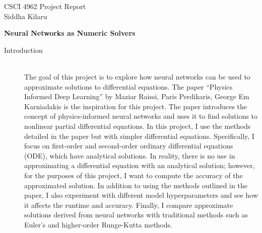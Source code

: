 \documentclass[12pt]{article}
\newcommand{\bgc}{\begin{center}}
\newcommand{\enc}{\end{center}}
\begin{document}
\noindent CSCI 4962 \hfill Project Report \\
Siddha Kilaru \\

\bgc
\textbf{Neural Networks as Numeric Solvers}
\enc

\begin{description}
    \item[Introduction] \hfill \\
    The goal of this project is to explore how neural networks can be used to
    approximate solutions to differential equations. The paper ``Physics
    Informed Deep Learning'' by Maziar Raissi, Paris Perdikaris, George Em
    Karniadakis is the inspiration for this project. The paper introduces the
    concept of physics-informed neural networks and uses it to find solutions
    to nonlinear partial differential equations. In this project, I use the
    methods detailed in the paper but with simpler differential equations.
    Specifically, I focus on first-order and second-order ordinary differential
    equations (ODE), which have analytical solutions. In reality, there is no
    use in approximating a differential equation with an analytical solution;
    however, for the purposes of this project, I want to compute the accuracy
    of the approximated solution. In addition to using the methods outlined in
    the paper, I also experiment with different model hyperparameters and see
    how it affects the runtime and accuracy. Finally, I compare approximate
    solutions derived from neural networks with traditional methods such as
    Euler's and higher-order Runge-Kutta methods.


\end{description}
\end{document}
